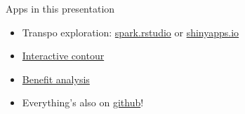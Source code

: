 \documentclass[sans,aspectratio=169,presentation,bigger,fleqn]{beamer}
\begin{document}
\begin{frame}[label=sec-23]{Apps in this presentation}
\begin{itemize}
\item Transpo exploration: \href{http://spark.rstudio.com/jwhendy/transpo-exploration/}{spark.rstudio} or \href{http://jwhendy.shinyapps.io/transpo-exploration}{shinyapps.io}
\item \href{http://spark.rstudio.com/jwhendy/interactive-contour/}{Interactive contour}
\item \href{http://spark.rstudio.com/jwhendy/insurance-visualizer/}{Benefit analysis}
\item Everything's also on \href{https://github.com/jwhendy/devFest-shiny}{github}!
\end{itemize}
\end{frame}
\end{document}
